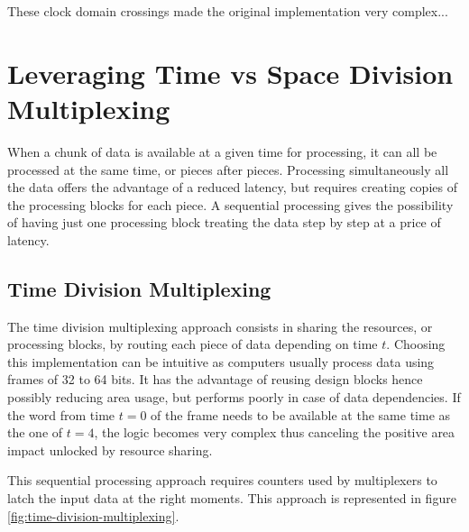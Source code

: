These clock domain crossings made the original implementation very complex...

\section{Leveraging Time vs Space Division Multiplexing}\label{sec:leveraging-time-division-multiplexing}

When a chunk of data is available at a given time for processing, it can all be processed at the same time, or pieces after pieces.
Processing simultaneously all the data offers the advantage of a reduced latency, but requires creating copies of the processing 
blocks for each piece. A sequential processing gives the possibility of having just one processing block treating the data step 
by step at a price of latency.

\subsection{Time Division Multiplexing}\label{sec:time-division-multiplexing}
The time division multiplexing approach consists in sharing the resources, or processing blocks, by routing each piece of data depending on time \(t\). Choosing this implementation can be intuitive as computers usually process data using frames of 32 to 64 bits. It has the advantage of reusing design blocks hence possibly reducing area usage, but performs poorly in case of data dependencies. If the word from time \(t=0\) of the frame needs to be available at the same time as the one of \(t=4\), the logic becomes very complex thus canceling the positive area impact unlocked by resource sharing.

This sequential processing approach requires counters used by multiplexers to latch the input data at the right moments. This approach is represented in figure \ref{fig:time-division-multiplexing}.

